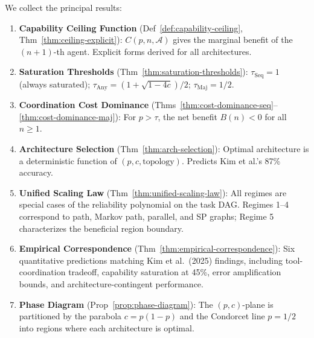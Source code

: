 We collect the principal results:

\begin{enumerate}
  \item \textbf{Capability Ceiling Function} (Def~\ref{def:capability-ceiling},
    Thm~\ref{thm:ceiling-explicit}): $C(p,n,\mathcal{A})$ gives the marginal
    benefit of the $(n+1)$-th agent. Explicit forms derived for all architectures.

  \item \textbf{Saturation Thresholds} (Thm~\ref{thm:saturation-thresholds}):
    $\tau_{\mathrm{Seq}} = 1$ (always saturated); $\tau_{\mathrm{Any}} =
    (1+\sqrt{1-4c})/2$; $\tau_{\mathrm{Maj}} = 1/2$.

  \item \textbf{Coordination Cost Dominance}
    (Thms~\ref{thm:cost-dominance-seq}--\ref{thm:cost-dominance-maj}):
    For $p > \tau$, the net benefit $B(n) < 0$ for all $n \geq 1$.

  \item \textbf{Architecture Selection} (Thm~\ref{thm:arch-selection}):
    Optimal architecture is a deterministic function of $(p, c, \text{topology})$.
    Predicts Kim et al.'s 87\% accuracy.

  \item \textbf{Unified Scaling Law} (Thm~\ref{thm:unified-scaling-law}):
    All regimes are special cases of the reliability polynomial on the task DAG.
    Regimes 1--4 correspond to path, Markov path, parallel, and SP graphs;
    Regime 5 characterizes the beneficial region boundary.

  \item \textbf{Empirical Correspondence} (Thm~\ref{thm:empirical-correspondence}):
    Six quantitative predictions matching Kim et al.\ (2025) findings, including
    tool-coordination tradeoff, capability saturation at 45\%, error amplification
    bounds, and architecture-contingent performance.

  \item \textbf{Phase Diagram} (Prop~\ref{prop:phase-diagram}): The $(p,c)$-plane
    is partitioned by the parabola $c = p(1-p)$ and the Condorcet line $p = 1/2$
    into regions where each architecture is optimal.
\end{enumerate}
